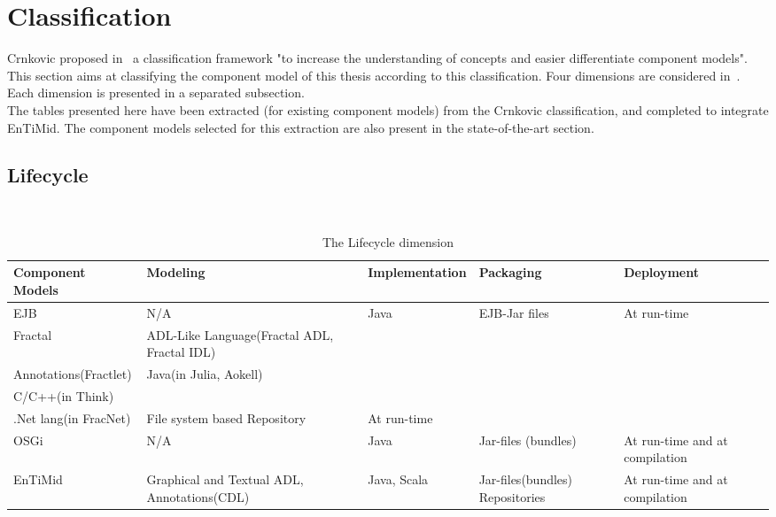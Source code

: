 \section{Classification}

Crnkovic proposed in~\cite{Crnkovic_1374:2007} a classification framework "to increase the understanding of concepts and easier differentiate component models". This section aims at classifying the component model of this thesis according to this classification. Four dimensions are considered in~\cite{Crnkovic_1374:2007}. Each dimension is presented in a separated subsection.\\

The tables presented here have been extracted (for existing component models) from the Crnkovic classification, and completed to integrate EnTiMid. The component models selected for this extraction are also present in the state-of-the-art section.
\vspace{1cm}
\subsection{Lifecycle}
~\vspace{-0,5cm}
\begin{table}[h!]
\centering
{\scriptsize 
\begin{tabular}{|>{\centering}m{}||>{\centering}m{}|>{\centering}m{}|>{\centering}m{}|>{\centering\arraybackslash}m{}|}
\hline
Component Models & Modeling & Implementation & Packaging & Deployment \\
\hline
EJB & N/A & Java & EJB-Jar files & At run-time \\
\hline
Fractal & ADL-Like Language(Fractal ADL, Fractal IDL)\\ Annotations(Fractlet) & Java(in Julia, Aokell)\\ C/C++(in Think)\\ .Net lang(in FracNet) & File system based Repository & At run-time \\
\hline
OSGi & N/A & Java & Jar-files (bundles) & At run-time and at compilation \\
\hline\hline
EnTiMid & Graphical and Textual ADL, Annotations(CDL) & Java, Scala & Jar-files(bundles) Repositories & At run-time and at compilation \\
\hline
\end{tabular}
}
\caption{The Lifecycle dimension}
\label{tabl:classifLifeycle}
\end{table}
\vspace{-0,2cm}

